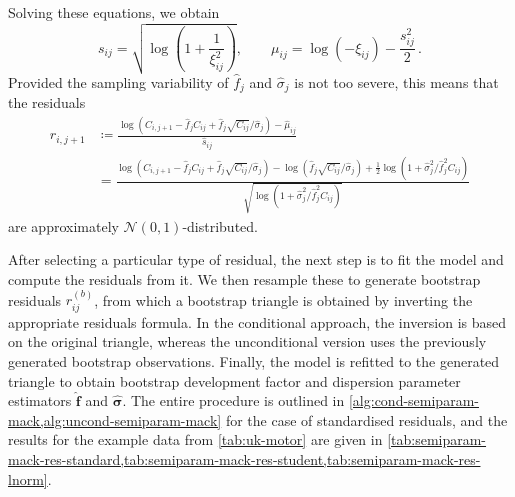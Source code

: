 \documentclass[a4paper]{book}
\begin{document}
Solving these equations, we obtain
\begin{equation}
  s_{ij} = \sqrt{\log \left( 1 + \frac{1}{\xi^2_{ij}} \right)}, \qquad \mu_{ij} = \log(-\xi_{ij}) - \frac{s^2_{ij}}{2} \,.
\end{equation}
Provided the sampling variability of $\widehat{f}_j$ and $\widehat{\sigma}_j$ is not too severe, this means that the residuals
\begin{align} \label{eq:log-normal-resids}
  r_{i, j + 1}
   & \coloneqq \frac{\log \left( C_{i, j + 1} - \widehat{f}_j C_{ij} + \widehat{f}_j \sqrt{C_{ij}} / \widehat{\sigma}_j \right) - \widehat{\mu}_{ij}}{\widehat{s}_{ij}}                                                                                                                                                                             \\
   & = \frac{\log \left( C_{i, j + 1} - \widehat{f}_j C_{ij} + \widehat{f}_j \sqrt{C_{ij}} / \widehat{\sigma}_j \right) - \log(\widehat{f}_j \sqrt{C_{ij}} / \widehat{\sigma}_j) + \frac{1}{2} \log \left( 1 + \widehat{\sigma}^2_j / \widehat{f}^2_j C_{ij} \right)}{\sqrt{\log \left( 1 + \widehat{\sigma}^2_j / \widehat{f}^2_j C_{ij} \right)}}
\end{align}
are approximately $\mathcal{N}(0, 1)$-distributed.

After selecting a particular type of residual, the next step is to fit the model and compute the residuals from it. We then resample these to generate bootstrap residuals $r^{(b)}_{ij}$, from which a bootstrap triangle is obtained by inverting the appropriate residuals formula. In the conditional approach, the inversion is based on the original triangle, whereas the unconditional version uses the previously generated bootstrap observations. Finally, the model is refitted to the generated triangle to obtain bootstrap development factor and dispersion parameter estimators $\widehat{\bm{f}}$ and $\widehat{\bm{\sigma}}$. The entire procedure is outlined in \cref{alg:cond-semiparam-mack,alg:uncond-semiparam-mack} for the case of standardised residuals, and the results for the example data from \cref{tab:uk-motor} are given in \cref{tab:semiparam-mack-res-standard,tab:semiparam-mack-res-student,tab:semiparam-mack-res-lnorm}.
\end{document}

